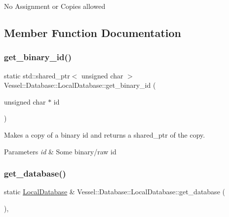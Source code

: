 No Assignment or Copies allowed 

\subsection{Member Function Documentation}
\mbox{\label{class_vessel_1_1_database_1_1_local_database_a2fabf54b26f3d3b0b29b1a682f8ed718}} 
\subsubsection{\texorpdfstring{get\+\_\+binary\+\_\+id()}{get\_binary\_id()}}
{\footnotesize\ttfamily static std\+::shared\+\_\+ptr$<$ unsigned char $>$ Vessel\+::\+Database\+::\+Local\+Database\+::get\+\_\+binary\+\_\+id (\begin{DoxyParamCaption}\item[{unsigned char $\ast$}]{id }\end{DoxyParamCaption})\hspace{0.3cm}{\ttfamily [static]}}



Makes a copy of a binary id and returns a shared\+\_\+ptr of the copy. 


\begin{DoxyParams}{Parameters}
{\em id} & Some binary/raw id \\
\hline
\end{DoxyParams}
\mbox{\label{class_vessel_1_1_database_1_1_local_database_ad5d9f9dda2ad243ca640f7cf07de34d7}} 
\subsubsection{\texorpdfstring{get\+\_\+database()}{get\_database()}}
{\footnotesize\ttfamily static \hyperlink{class_vessel_1_1_database_1_1_local_database}{Local\+Database} \& Vessel\+::\+Database\+::\+Local\+Database\+::get\+\_\+database (\begin{DoxyParamCaption}{ }\end{DoxyParamCaption})\hspace{0.3cm}{\ttfamily [inline]}, {\ttfamily [static]}}



